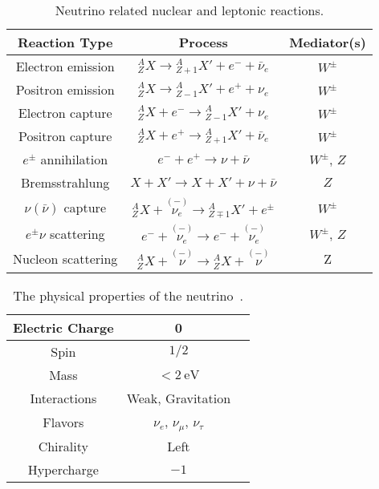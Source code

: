 \begin{table}[ht]
\centering
 \begin{tabular}{|c | c | c|}
 \hline
 Reaction Type & Process & Mediator(s)   \\ [0.5ex]
 \hline
 Electron emission & ${}^A_Z X \to {}^A_{Z+1}X' + e^- +\bar \nu_e$ & $W^{\pm}$  \\
 Positron emission & ${}^A_Z X \to {}^A_{Z-1}X' + e^+ + \nu_e$ & $W^{\pm}$  \\
 Electron capture & ${}^A_Z X + e^- \to {}^A_{Z-1}X'  + \nu_e$ &  $W^{\pm}$ \\
 Positron capture & ${}^A_Z X + e^+ \to {}^A_{Z+1}X'  + \bar\nu_e$ &  $W^{\pm}$ \\
 [0.5ex]
 \hline

 $e^{\pm}$ annihilation &  $e^- + e^+  \to \nu + \bar\nu $  & $W^{\pm}$, $Z$ \\
 Bremsstrahlung & $X+X' \to X + X' + \nu + \bar\nu$ & $Z$ \\
 [0.5ex]
 \hline

  $\nu (\bar\nu)$ capture & ${}^A_{Z}X + \overset{(-)}{\nu_e} \to {}^A_{Z\mp 1}X' + e^\pm $ & $W^{\pm}$\\
  [1ex]
 \hline
 $e^\pm\nu$ scattering & $e^- + \overset{(-)}{\nu_e} \to e^- + \overset{(-)}{\nu_e} $ &  $W^{\pm}$, $Z$ \\
 Nucleon scattering & $ {}^A_Z X + \overset{(-)}{\nu} \to {}^A_Z X + \overset{(-)}{\nu} $ &  Z\\
 [0.5ex]
 \hline
 \end{tabular}
 \caption{Neutrino related nuclear and leptonic reactions.}
\label{table:Neutrino_Reactions}
\end{table}

\begin{table}[ht]
\centering
 \begin{tabular}{|c | c | c|}
 \hline
  Electric Charge & 0\\
  \hline
  Spin & $1/2$ \\
\hline
 Mass & $<2~\mathrm{eV}$ \\
 \hline
 Interactions & Weak, Gravitation  \\
 \hline
 Flavors & $\nu_e$, $\nu_\mu$, $\nu_\tau$ \\
 \hline
 Chirality & Left \\
 \hline
 Hypercharge & $-1$ \\
 \hline

 \end{tabular}
 \caption{The physical properties of the neutrino~\cite{Patrignani:2016xqp}.}
\label{table:neutrino-properties}
\end{table}

